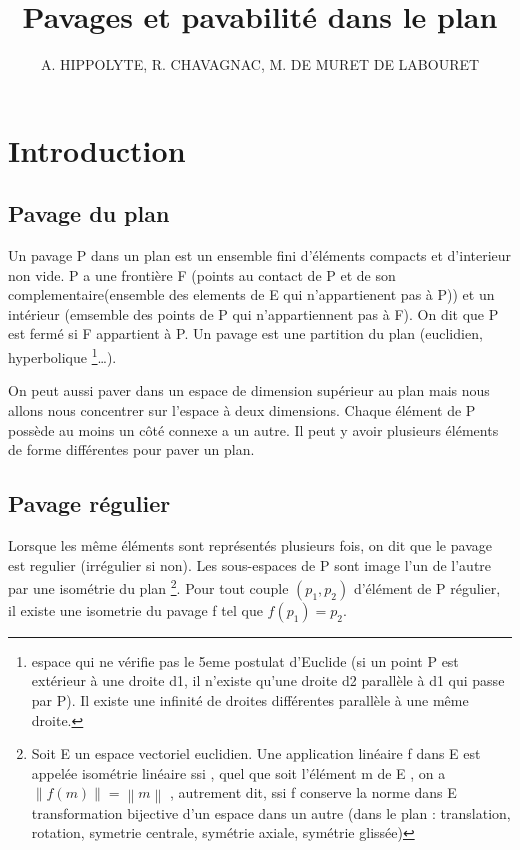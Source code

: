 \documentclass{article}
\title{Pavages et pavabilité dans le plan}
\author{A. HIPPOLYTE, R. CHAVAGNAC, M. DE MURET DE LABOURET}
\begin{document}
\maketitle

\tableofcontents

\newpage

\section{Introduction}

\subsection{Pavage du plan}

Un pavage P dans un plan est un ensemble fini d'éléments compacts et d’interieur non vide.
P a une frontière F (points au contact de P et de son complementaire(ensemble des elements de E qui n'appartienent pas à P)) et un intérieur (emsemble des points de P qui n'appartiennent pas à F).
On dit que P est fermé si F appartient à P.
Un pavage est une partition du plan (euclidien, hyperbolique \footnote{ espace qui ne vérifie pas le 5eme postulat d’Euclide (si un point P est extérieur à une droite d1, il n’existe qu’une droite d2 parallèle à d1 qui passe par P). Il existe une infinité de droites différentes parallèle à une même droite. }…).

On peut aussi paver dans un espace de dimension supérieur au plan mais nous allons nous concentrer sur l’espace à deux dimensions.
Chaque élément de P possède au moins un côté connexe a un autre.
Il peut y avoir plusieurs éléments de forme différentes pour paver un plan.

\subsection{Pavage régulier}

Lorsque les même éléments sont représentés plusieurs fois, on dit que le pavage est regulier (irrégulier si non).
Les sous-espaces de P sont image l’un de l’autre par une isométrie du plan \footnote{ Soit E un espace vectoriel euclidien. Une application linéaire f dans E est appelée isométrie linéaire ssi , quel que soit l’élément m de E , on a $\left \| f\left ( m \right ) \right \| = \left \| m \right \|$ , autrement dit, ssi f conserve la norme dans E transformation bijective d'un espace dans un autre (dans le plan : translation, rotation, symetrie centrale, symétrie axiale, symétrie glissée)}.
Pour tout couple $\left ( p_{1} ,p_{2}\right )$ d'élément de P régulier, il existe une isometrie du pavage f tel que $f\left (  p_{1}\right )=p_{2}$.
\end{document}
